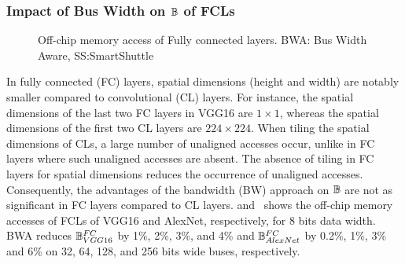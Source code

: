 \subsubsection{Impact of Bus Width on $\mathbb{B}$ of FCLs}
\begin{figure}[htb]
	\centering
	\hfil
	\hfil	
	\caption{Off-chip memory access of Fully connected layers. BWA: Bus Width Aware, SS:SmartShuttle}
	\label{fig:EffectOnFC}
	\vspace{-1.0em}
\end{figure}
In fully connected (FC) layers, spatial dimensions (height and width) are notably smaller compared to convolutional (CL) layers. For instance, the spatial dimensions of the last two FC layers in VGG16 are $1{\times}1$, whereas the spatial dimensions of the first two CL layers are $224{\times}224$. When tiling the spatial dimensions of CLs, a large number of unaligned accesses occur, unlike in FC layers where such unaligned accesses are absent. The absence of tiling in FC layers for spatial dimensions reduces the occurrence of unaligned accesses. Consequently, the advantages of the bandwidth (BW) approach on $\mathbb{B}$ are not as significant in FC layers compared to CL layers.  and~ shows the off-chip memory accesses of FCLs of VGG16 and AlexNet, respectively, for 8 bits data width. BWA reduces $\mathbb{B}_{VGG16}^{FC}$ by 1\%, 2\%, 3\%, and 4\% and $\mathbb{B}_{AlexNet}^{FC}$ by 0.2\%, 1\%, 3\% and 6\% on 32, 64, 128, and 256 bits wide buses, respectively.
